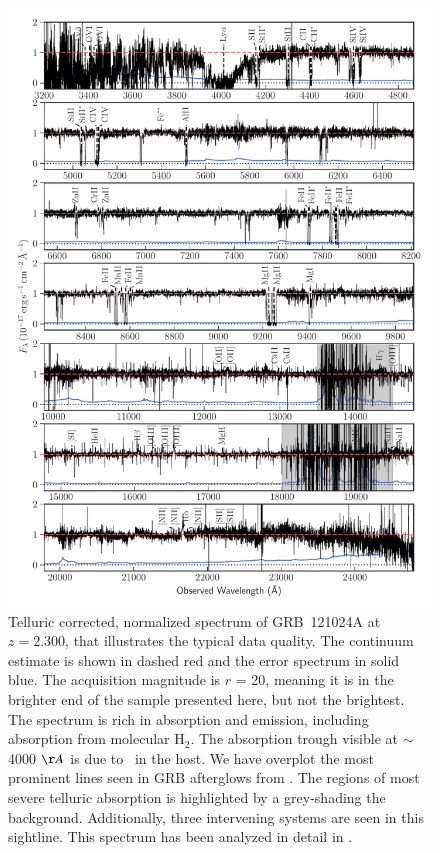 \documentclass{aa}    %
\begin{document}
\begin{figure}
	\centerline{\includegraphics[width=0.85\linewidth]{figures/GRB121024A.pdf}}
\caption{Telluric corrected, normalized spectrum of GRB~121024A at $z = 2.300$,
	that illustrates the typical data quality. The continuum estimate is shown in
	dashed red and the error spectrum in solid blue. The acquisition magnitude is
	$r$ = 20, meaning it is in the brighter end of the sample presented here, but
	not the brightest. The spectrum is rich in absorption and emission, including
	absorption from molecular $\mathrm{H_2}$. The absorption trough visible at
	$\sim$ 4000 $\AA$ is due to \lya~in the host. We have overplot the most
	prominent lines seen in GRB afterglows from \citet{Christensen2011a}. The
	regions of most severe telluric absorption is highlighted by a grey-shading the
	background. Additionally, three intervening systems are seen in this sightline.
	This spectrum has been analyzed in detail in \citet{Friis2015}.}
\label{fig:spectrum}
\end{figure}



\end{document}
